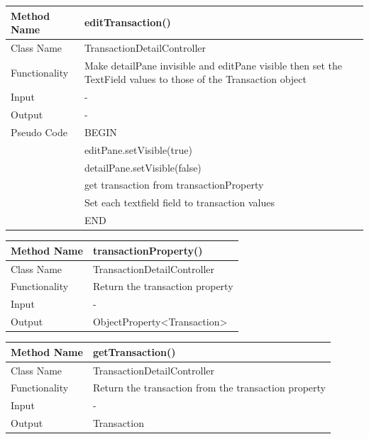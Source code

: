 \documentclass[12pt]{article}
\begin{document}
\begin{tabular}{ |p{3cm}||p{\colWidth}|  }
	\hline
	Method Name &  editTransaction() \\
	\hline
	Class Name & TransactionDetailController\\
	\hline
	Functionality & Make detailPane invisible and editPane visible then set the TextField values to those of the Transaction object\\
	\hline
	Input & -\\
	\hline
	Output & -\\
	\hline
	Pseudo Code & BEGIN\\
	& 	editPane.setVisible(true) \\
	& 	detailPane.setVisible(false)\\
	&   get transaction from transactionProperty\\
	& 	Set each textfield field to transaction values \\ 
	& END\\
	\hline
\end{tabular}  

\begin{tabular}{ |p{3cm}||p{\colWidth}|  }
	\hline
	Method Name &  transactionProperty() \\
	\hline
	Class Name & TransactionDetailController\\
	\hline
	Functionality & Return the transaction property\\
	\hline
	Input & -\\
	\hline
	Output & ObjectProperty<Transaction>\\
	\hline
\end{tabular}  

\begin{tabular}{ |p{3cm}||p{\colWidth}|  }
	\hline
	Method Name &  getTransaction() \\
	\hline
	Class Name & TransactionDetailController\\
	\hline
	Functionality & Return the transaction from the transaction property\\
	\hline
	Input & -\\
	\hline
	Output & Transaction\\
	\hline
\end{tabular}  
\end{document}
